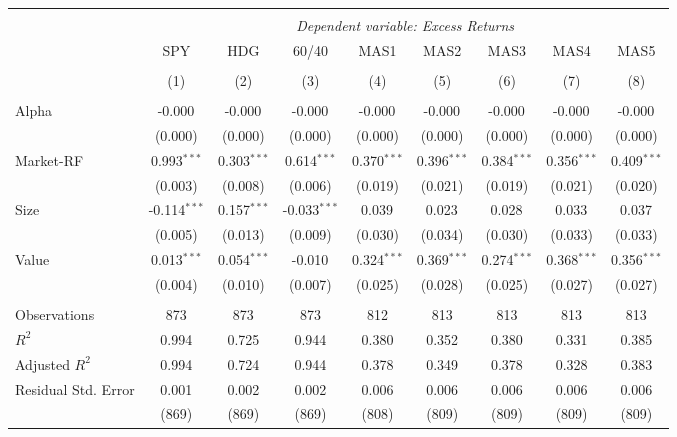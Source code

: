 \begin{table}[!htbp] \centering
\begin{tabular}{@{\extracolsep{5pt}}lcccccccc}
\\[-1.8ex]\hline
\hline \\[-1.8ex]
& \multicolumn{8}{c}{\textit{Dependent variable: Excess Returns}} \
\cr \cline{2-9}
\\[-1.8ex] & \multicolumn{1}{c}{SPY} & \multicolumn{1}{c}{HDG} & \multicolumn{1}{c}{60/40} & \multicolumn{1}{c}{MAS1} & \multicolumn{1}{c}{MAS2} & \multicolumn{1}{c}{MAS3} & \multicolumn{1}{c}{MAS4} & \multicolumn{1}{c}{MAS5}  \\
\\[-1.8ex] & (1) & (2) & (3) & (4) & (5) & (6) & (7) & (8) \\
\hline \\[-1.8ex]
 Alpha & -0.000$^{}$ & -0.000$^{}$ & -0.000$^{}$ & -0.000$^{}$ & -0.000$^{}$ & -0.000$^{}$ & -0.000$^{}$ & -0.000$^{}$ \\
& (0.000) & (0.000) & (0.000) & (0.000) & (0.000) & (0.000) & (0.000) & (0.000) \\
 Market-RF & 0.993$^{***}$ & 0.303$^{***}$ & 0.614$^{***}$ & 0.370$^{***}$ & 0.396$^{***}$ & 0.384$^{***}$ & 0.356$^{***}$ & 0.409$^{***}$ \\
& (0.003) & (0.008) & (0.006) & (0.019) & (0.021) & (0.019) & (0.021) & (0.020) \\
 Size & -0.114$^{***}$ & 0.157$^{***}$ & -0.033$^{***}$ & 0.039$^{}$ & 0.023$^{}$ & 0.028$^{}$ & 0.033$^{}$ & 0.037$^{}$ \\
& (0.005) & (0.013) & (0.009) & (0.030) & (0.034) & (0.030) & (0.033) & (0.033) \\
 Value & 0.013$^{***}$ & 0.054$^{***}$ & -0.010$^{}$ & 0.324$^{***}$ & 0.369$^{***}$ & 0.274$^{***}$ & 0.368$^{***}$ & 0.356$^{***}$ \\
& (0.004) & (0.010) & (0.007) & (0.025) & (0.028) & (0.025) & (0.027) & (0.027) \\
\hline \\[-1.8ex]
 Observations & 873 & 873 & 873 & 812 & 813 & 813 & 813 & 813 \\
 $R^2$ & 0.994 & 0.725 & 0.944 & 0.380 & 0.352 & 0.380 & 0.331 & 0.385 \\
 Adjusted $R^2$ & 0.994 & 0.724 & 0.944 & 0.378 & 0.349 & 0.378 & 0.328 & 0.383 \\
 Residual Std. Error & 0.001 & 0.002 & 0.002 & 0.006 & 0.006 & 0.006 & 0.006 & 0.006 \\
 & (869) & (869) & (869) & (808) & (809) & (809) & (809) & (809) \\

\end{tabular}
\end{table}
